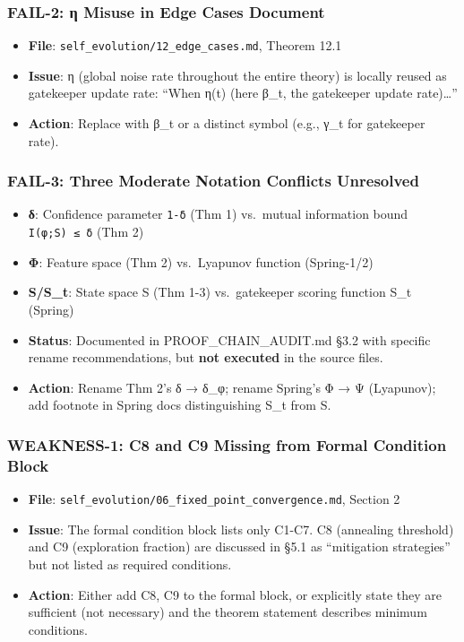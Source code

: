 \documentclass[
  12pt,
]{ctexart}
\providecommand{\tightlist}{%
  \setlength{\itemsep}{0pt}\setlength{\parskip}{0pt}}
\begin{document}
\subsubsection{FAIL-2: η Misuse in Edge Cases
Document}\label{fail-2-ux3b7-misuse-in-edge-cases-document}

\begin{itemize}
\tightlist
\item
  \textbf{File}: \texttt{self\_evolution/12\_edge\_cases.md}, Theorem
  12.1
\item
  \textbf{Issue}: η (global noise rate throughout the entire theory) is
  locally reused as gatekeeper update rate: ``When η(t) (here β\_t, the
  gatekeeper update rate)\ldots{}''
\item
  \textbf{Action}: Replace with β\_t or a distinct symbol (e.g., γ\_t
  for gatekeeper rate).
\end{itemize}

\subsubsection{FAIL-3: Three Moderate Notation Conflicts
Unresolved}\label{fail-3-three-moderate-notation-conflicts-unresolved}

\begin{itemize}
\tightlist
\item
  \textbf{δ}: Confidence parameter \texttt{1-δ} (Thm 1) vs.~mutual
  information bound \texttt{I(φ;S)\ ≤\ δ} (Thm 2)
\item
  \textbf{Φ}: Feature space (Thm 2) vs.~Lyapunov function (Spring-1/2)
\item
  \textbf{S/S\_t}: State space S (Thm 1-3) vs.~gatekeeper scoring
  function S\_t (Spring)
\item
  \textbf{Status}: Documented in PROOF\_CHAIN\_AUDIT.md §3.2 with
  specific rename recommendations, but \textbf{not executed} in the
  source files.
\item
  \textbf{Action}: Rename Thm 2's δ → δ\_φ; rename Spring's Φ → Ψ
  (Lyapunov); add footnote in Spring docs distinguishing S\_t from S.
\end{itemize}

\subsubsection{WEAKNESS-1: C8 and C9 Missing from Formal Condition
Block}\label{weakness-1-c8-and-c9-missing-from-formal-condition-block}

\begin{itemize}
\tightlist
\item
  \textbf{File}:
  \texttt{self\_evolution/06\_fixed\_point\_convergence.md}, Section 2
\item
  \textbf{Issue}: The formal condition block lists only C1-C7. C8
  (annealing threshold) and C9 (exploration fraction) are discussed in
  §5.1 as ``mitigation strategies'' but not listed as required
  conditions.
\item
  \textbf{Action}: Either add C8, C9 to the formal block, or explicitly
  state they are sufficient (not necessary) and the theorem statement
  describes minimum conditions.
\end{itemize}
\end{document}
